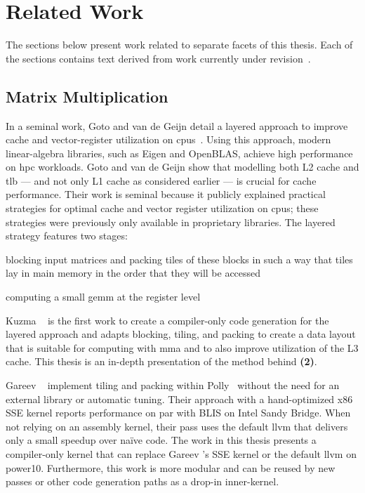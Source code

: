 \documentclass[\main/thesis.tex]{subfiles}
\begin{document}
\chapter{Related Work}
\label{cha:related}
The sections below present work related to separate facets of this thesis.
Each of the sections contains text derived from work currently under revision~\autocite{kuzma2021fast}.

\section{Matrix Multiplication}
In a seminal work, Goto and van de Geijn detail a layered approach to improve cache and vector-register utilization on \glspl{cpu}~\autocite{goto2008anatomy}.
Using this approach, modern linear-algebra libraries, such as Eigen and OpenBLAS, achieve high performance on \gls{hpc} workloads.
Goto and van de Geijn show that modelling both L2 cache and \gls{tlb} --- and not only L1 cache as considered earlier --- is crucial for cache performance.
Their work is seminal because it publicly explained practical strategies for optimal cache and vector register utilization on \glspl{cpu}; these strategies were previously only available in proprietary libraries.
The layered strategy features two stages:
\begin{enumerate*}[itemjoin={{; }}, itemjoin*={{; and }}, label=\textbf{(\arabic*)}, after={.}]
  \item blocking input matrices and packing tiles of these blocks in such a way that tiles lay in main memory in the order that they will be accessed
  \item computing a small \gls{gemm} at the register level
\end{enumerate*}
Kuzma \etal~\autocite{kuzma2021fast} is the first work to create a compiler-only code generation for the layered approach and adapts blocking, tiling, and packing to create a data layout that is suitable for computing with \gls{mma} and to also improve utilization of the L3 cache.
This thesis is an in-depth presentation of the method behind \textbf{(2)}.

Gareev \etal~\autocite{gareev2018high} implement tiling and packing within Polly~\autocite{grosser2011polly,grosser2012polly} without the need for an external library or automatic tuning.
Their approach with a hand-optimized x86 SSE kernel reports performance on par with BLIS on Intel Sandy Bridge.
When not relying on an assembly kernel, their pass uses the default \gls{llvm}  that delivers only a small speedup over na\"ive code.
The work in this thesis presents a compiler-only kernel that can replace Gareev \etal's SSE kernel or the default \gls{llvm}  on \gls{power10}.
Furthermore, this work is more modular and can be reused by new passes or other code generation paths as a drop-in inner-kernel.
\end{document}
